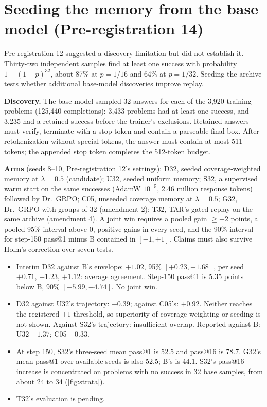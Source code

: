 \documentclass[11pt]{article}
\begin{document}
\section{Seeding the memory from the base model (Pre-registration 14)}\label{sec:p14}
\begin{why}
Pre-registration 12 suggested a discovery limitation but did not establish it. Thirty-two independent samples find at least one success with probability $1-(1-p)^{32}$, about 87\% at $p=1/16$ and 64\% at $p=1/32$. Seeding the archive tests whether additional base-model discoveries improve replay.
\end{why}
\textbf{Discovery.} The base model sampled 32 answers for each of the 3,920 training problems (125,440 completions): 3,433 problems had at least one success, and 3,235 had a retained success before the trainer's exclusions. Retained answers must verify, terminate with a stop token and contain a parseable final box. After retokenization without special tokens, the answer must contain at most 511 tokens; the appended stop token completes the 512-token budget.

\textbf{Arms} (seeds 8--10, Pre-registration 12's settings): D32, seeded coverage-weighted memory at $\lambda=0.5$ (candidate); U32, seeded uniform memory; S32, a supervised warm start on the same successes (AdamW $10^{-5}$, 2.46 million response tokens) followed by Dr.\ GRPO; C05, unseeded coverage memory at $\lambda=0.5$; G32, Dr.\ GRPO with groups of 32 (amendment 2); T32, TAR's gated replay on the same archive (amendment 4). A joint win requires a pooled gain $\ge+2$ points, a pooled 95\% interval above 0, positive gains in every seed, and the 90\% interval for step-150 pass@1 minus B contained in $[-1,+1]$. Claims must also survive Holm's correction over seven tests.

\begin{found}
\begin{itemize}[leftmargin=*,itemsep=1pt]
\item Interim D32 against B's envelope: $+1.02$, 95\% $[+0.23,+1.68]$, per seed $+0.71$, $+1.23$, $+1.12$: average agreement. Step-150 pass@1 is 5.35 points below B, 90\% $[-5.99,-4.74]$. No joint win.
\item D32 against U32's trajectory: $-0.39$; against C05's: $+0.92$. Neither reaches the registered $+1$ threshold, so superiority of coverage weighting or seeding is not shown. Against S32's trajectory: insufficient overlap. Reported against B: U32 $+1.37$; C05 $+0.33$.
\item At step 150, S32's three-seed mean pass@1 is 52.5 and pass@16 is 78.7. G32's mean pass@1 over available seeds is also 52.5; B's is 44.1. S32's pass@16 increase is concentrated on problems with no success in 32 base samples, from about 24 to 34 (\cref{fig:strata}).
\item T32's evaluation is pending.
\end{itemize}
\end{found}
\end{document}
